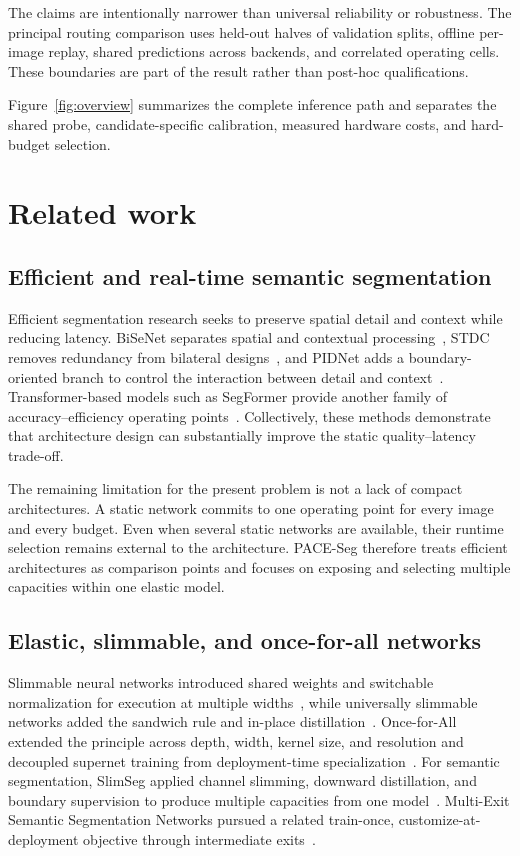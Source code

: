 \documentclass[a4paper,review,12pt]{elsarticle}
\newcommand{\method}{PACE-Seg}
\begin{document}
The claims are intentionally narrower than universal reliability or robustness. The principal routing comparison uses held-out halves of validation splits, offline per-image replay, shared predictions across backends, and correlated operating cells. These boundaries are part of the result rather than post-hoc qualifications.

Figure~\ref{fig:overview} summarizes the complete inference path and separates the shared probe, candidate-specific calibration, measured hardware costs, and hard-budget selection.



\section{Related work}
\label{sec:related}

\subsection{Efficient and real-time semantic segmentation}

Efficient segmentation research seeks to preserve spatial detail and context while reducing latency. BiSeNet separates spatial and contextual processing~\cite{yu2018bisenet}, STDC removes redundancy from bilateral designs~\cite{fan2021stdc}, and PIDNet adds a boundary-oriented branch to control the interaction between detail and context~\cite{xu2023pidnet}. Transformer-based models such as SegFormer provide another family of accuracy--efficiency operating points~\cite{xie2021segformer}. Collectively, these methods demonstrate that architecture design can substantially improve the static quality--latency trade-off.

The remaining limitation for the present problem is not a lack of compact architectures. A static network commits to one operating point for every image and every budget. Even when several static networks are available, their runtime selection remains external to the architecture. \method{} therefore treats efficient architectures as comparison points and focuses on exposing and selecting multiple capacities within one elastic model.

\subsection{Elastic, slimmable, and once-for-all networks}

Slimmable neural networks introduced shared weights and switchable normalization for execution at multiple widths~\cite{yu2019slimmable}, while universally slimmable networks added the sandwich rule and in-place distillation~\cite{yu2019usnet}. Once-for-All extended the principle across depth, width, kernel size, and resolution and decoupled supernet training from deployment-time specialization~\cite{cai2020ofa}. For semantic segmentation, SlimSeg applied channel slimming, downward distillation, and boundary supervision to produce multiple capacities from one model~\cite{xue2022slimseg}. Multi-Exit Semantic Segmentation Networks pursued a related train-once, customize-at-deployment objective through intermediate exits~\cite{kouris2022mess}.
\end{document}
